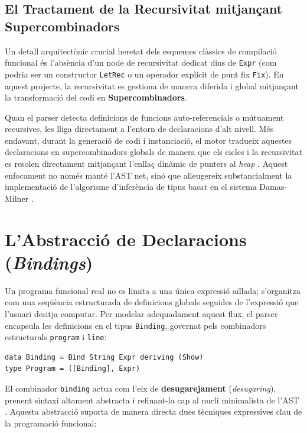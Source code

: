 \subsection{El Tractament de la Recursivitat mitjançant Supercombinadors}
Un detall arquitectònic crucial heretat dels esquemes clàssics de compilació funcional \cite{peyton1987implementation, turner1979new} és l'absència d'un node de recursivitat dedicat dins de \texttt{Expr} (com podria ser un constructor \texttt{LetRec} o un operador explícit de punt fix \texttt{Fix}). En aquest projecte, la recursivitat es gestiona de manera diferida i global mitjançant la transformació del codi en \textbf{Supercombinadors}. 

Quan el parser detecta definicions de funcions auto-referencials o mútuament recursives, les lliga directament a l'entorn de declaracions d'alt nivell. Més endavant, durant la generació de codi i instanciació, el motor tradueix aquestes declaracions en supercombinadors globals de manera que els cicles i la recursivitat es resolen directament mitjançant l'enllaç dinàmic de punters al \textit{heap} \cite{turner1979new}. Aquest enfocament no només manté l'AST net, sinó que alleugereix substancialment la implementació de l'algorisme d'inferència de tipus basat en el sistema Damas-Milner \cite{damas1982principal}.

\section{L'Abstracció de Declaracions (\textit{Bindings})}

Un programa funcional real no es limita a una única expressió aïllada; s'organitza com una seqüència estructurada de definicions globals seguides de l'expressió que l'usuari desitja computar. Per modelar adequadament aquest flux, el parser encapsula les definicions en el tipus \texttt{Binding}, governat pels combinadors estructurals \texttt{program} i \texttt{line}:

\begin{lstlisting}[style=haskellstyle, caption=Estructures d'enllaç i flux del programa]
data Binding = Bind String Expr deriving (Show)
type Program = ([Binding], Expr)
\end{lstlisting}

El combinador \texttt{binding} actua com l'eix de \textbf{desugarejament} (\textit{desugaring}), prenent sintaxi altament abstracta i refinant-la cap al nucli minimalista de l'AST \cite{peyton1987implementation}. Aquesta abstracció suporta de manera directa dues tècniques expressives clau de la programació funcional:

